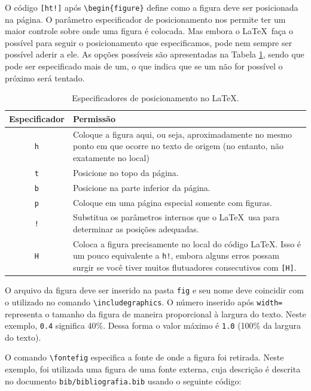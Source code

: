 O código \verb|[ht!]| após \verb|\begin{figure}| define como a figura deve ser posicionada na página. O parâmetro especificador de posicionamento nos permite ter um maior controle sobre onde uma figura é colocada. Mas embora o \LaTeX\ faça o possível para seguir o posicionamento que especificamos, pode nem sempre ser possível aderir a ele. As opções possíveis são apresentadas na Tabela \ref{tab:pos}, sendo que pode ser especificado mais de um, o que indica que se um não for possível o próximo será tentado.

\begin{table}[ht!]
\caption{Especificadores de posicionamento no \LaTeX.}
\label{tab:pos}
\begin{center}
\begin{tabular}{c|p{11.5cm}}
\hline
\textbf{Especificador} & \textbf{Permissão} \\
\hline
\verb|h| & Coloque a figura aqui, ou seja, aproximadamente no mesmo ponto em que ocorre no texto de origem (no entanto, não exatamente no local) \\
\hline
\verb|t| & Posicione no topo da página. \\
\hline
\verb|b| & Posicione na parte inferior da página. \\
\hline
\verb|p| & Coloque em uma página especial somente com figuras.\\
\hline
\verb|!| & Substitua os parâmetros internos que o \LaTeX\ usa para determinar as posições adequadas.\\
\hline
\verb|H| &  Coloca a figura precisamente no local do código \LaTeX. Isso é um pouco equivalente a \verb|h!|, embora alguns erros possam surgir se você tiver muitos flutuadores consecutivos com \verb|[H]|.\\
\hline
\end{tabular}
\end{center}
\end{table}

O arquivo da figura deve ser inserido na pasta \verb|fig| e seu nome deve coincidir com o utilizado no comando \verb|\includegraphics|. O número inserido após \verb|width=| representa o tamanho da figura de maneira proporcional à largura do texto. Neste exemplo, \verb|0.4| significa 40\%. Dessa forma o valor máximo é \verb|1.0| (100\% da largura do texto).

O comando \verb|\fontefig| especifica a fonte de onde a figura foi retirada. Neste exemplo, foi utilizada uma figura de uma fonte externa, cuja descrição é descrita no documento \verb|bib/bibliografia.bib| usando o seguinte código:

